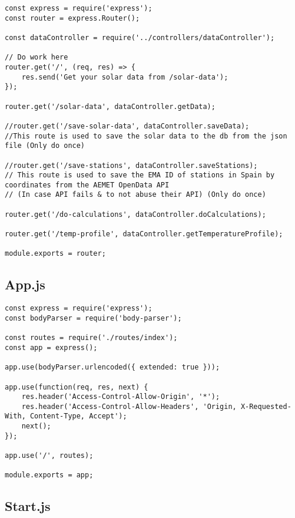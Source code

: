 \begin{lstlisting}[style=ES6, caption={Server/routes/index.js}]
const express = require('express');
const router = express.Router();

const dataController = require('../controllers/dataController');

// Do work here
router.get('/', (req, res) => {
	res.send('Get your solar data from /solar-data');
});

router.get('/solar-data', dataController.getData);

//router.get('/save-solar-data', dataController.saveData);
//This route is used to save the solar data to the db from the json file (Only do once)

//router.get('/save-stations', dataController.saveStations);
// This route is used to save the EMA ID of stations in Spain by coordinates from the AEMET OpenData API
// (In case API fails & to not abuse their API) (Only do once)

router.get('/do-calculations', dataController.doCalculations);

router.get('/temp-profile', dataController.getTemperatureProfile);

module.exports = router;
\end{lstlisting}

\subsection{App.js}

\begin{lstlisting}[style=ES6, caption={Server/App.js}]
const express = require('express');
const bodyParser = require('body-parser');

const routes = require('./routes/index');
const app = express();

app.use(bodyParser.urlencoded({ extended: true }));

app.use(function(req, res, next) {
	res.header('Access-Control-Allow-Origin', '*');
	res.header('Access-Control-Allow-Headers', 'Origin, X-Requested-With, Content-Type, Accept');
	next();
});

app.use('/', routes);

module.exports = app;
\end{lstlisting}

\subsection{Start.js}

